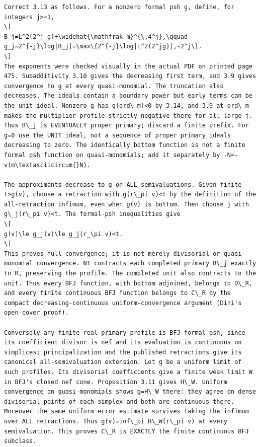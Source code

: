 \documentclass[11pt]{article}
\begin{document}
\begin{Verbatim}[fontsize=\tiny,breaklines=true,breakanywhere=true]
Correct 3.13 as follows. For a nonzero formal psh g, define, for integers j>=1,
\[
B_j=L^2(2^j g)+\widehat{\mathfrak m}^{\,4^j},\qquad
g_j=2^{-j}\log|B_j|=\max\{2^{-j}\log|L^2(2^jg)|,-2^j\}.
\]
The exponents were checked visually in the actual PDF on printed page 475. Subadditivity 3.10 gives the decreasing first term, and 3.9 gives convergence to g at every quasi-monomial. The truncation also decreases. The ideals contain a boundary power but early terms can be the unit ideal. Nonzero g has g(ord\_m)<0 by 3.14, and 3.9 at ord\_m makes the multiplier profile strictly negative there for all large j. Thus B\_j is EVENTUALLY proper primary; discard a finite prefix. For g=0 use the UNIT ideal, not a sequence of proper primary ideals decreasing to zero. The identically bottom function is not a finite formal psh function on quasi-monomials; add it separately by -N=-v(m\textasciicircum{}N).

The approximants decrease to g on ALL semivaluations. Given finite t>g(v), choose a retraction with g(r\_pi v)<t by the definition of the all-retraction infimum, even when g(v) is bottom. Then choose j with g\_j(r\_pi v)<t. The formal-psh inequalities give
\[
g(v)\le g_j(v)\le g_j(r_\pi v)<t.
\]
This proves full convergence; it is not merely divisorial or quasi-monomial convergence. N1 contracts each completed primary B\_j exactly to R, preserving the profile. The completed unit also contracts to the unit. Thus every BFJ function, with bottom adjoined, belongs to D\_R, and every finite continuous BFJ function belongs to C\_R by the compact decreasing-continuous uniform-convergence argument (Dini's open-cover proof).

Conversely any finite real primary profile is BFJ formal psh, since its coefficient divisor is nef and its evaluation is continuous on simplices; principalization and the published retractions give its canonical all-semivaluation extension. Let g be a uniform limit of such profiles. Its divisorial coefficients give a finite weak limit W in BFJ's closed nef cone. Proposition 3.11 gives H\_W. Uniform convergence on quasi-monomials shows g=H\_W there: they agree on dense divisorial points of each simplex and both are continuous there. Moreover the same uniform error estimate survives taking the infimum over ALL retractions. Thus g(v)=inf\_pi H\_W(r\_pi v) at every semivaluation. This proves C\_R is EXACTLY the finite continuous BFJ subclass.


\end{Verbatim}
\end{document}
